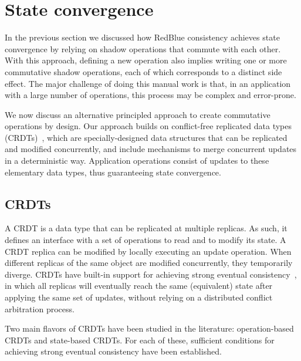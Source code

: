 \section{State convergence}
\label{sec:crdt}
In the previous section we discussed how RedBlue consistency achieves state convergence by
relying on shadow operations that commute with each other.
With this approach, defining a new operation also implies
writing one or more commutative shadow operations, each of which corresponds to a distinct side effect.
The major challenge of doing this manual work
is that, in an application with a large number of operations, this process may be
complex and error-prone.

We now discuss an alternative principled approach to create commutative operations by design.
Our approach builds on conflict-free replicated data types (CRDTs)~\cite{crdts}, which are
specially-designed data structures that can be replicated and modified concurrently,
and include mechanisms to merge concurrent updates in a deterministic way.
Application operations consist of updates to these elementary data types, thus
guaranteeing state convergence.

\subsection{CRDTs}

A CRDT is a data type that can be replicated at multiple replicas. As such,
it defines an interface with a set of operations to read and to modify its state.
A CRDT replica can be modified by locally executing an update operation.
When different replicas of the same object are modified concurrently, they
temporarily diverge.
CRDTs have built-in support for achieving strong eventual consistency~\cite{crdts}, in which
all replicas will eventually reach the same (equivalent) state after applying
the same set of updates, without relying on a distributed conflict arbitration
process.

Two main flavors of CRDTs have been studied in the literature: operation-based CRDTs
and state-based CRDTs. For each of these, sufficient conditions for
achieving strong eventual consistency have been established.

